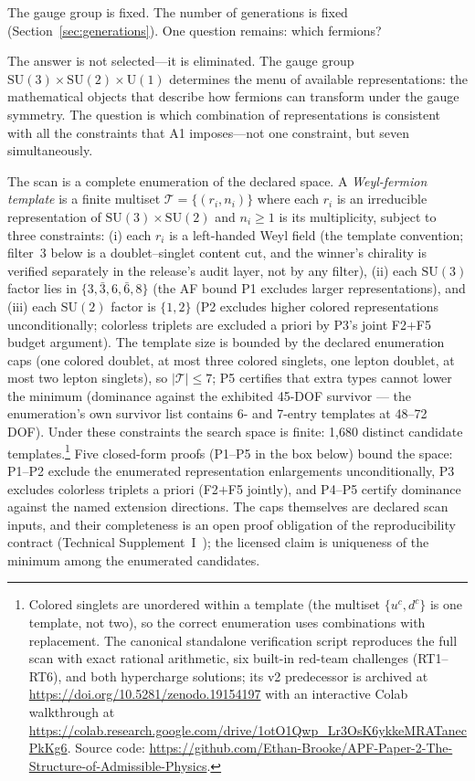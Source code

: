 \documentclass[11pt]{article}
\newcommand{\SU}{\mathrm{SU}}
\newcommand{\U}{\mathrm{U}}
\begin{document}
The gauge group is fixed.  The number of generations is fixed (Section~\ref{sec:generations}).  One question remains: which fermions?

The answer is not selected---it is eliminated.  The gauge group $\SU(3) \times \SU(2) \times \U(1)$ determines the menu of available representations: the mathematical objects that describe how fermions can transform under the gauge symmetry.  The question is which combination of representations is consistent with all the constraints that A1 imposes---not one constraint, but seven simultaneously.

The scan is a complete enumeration of the declared space.  A \emph{Weyl-fermion template} is a finite multiset $\mathcal{T} = \{(r_i, n_i)\}$ where each $r_i$ is an irreducible representation of $\SU(3) \times \SU(2)$ and $n_i \ge 1$ is its multiplicity, subject to three constraints: (i) each $r_i$ is a left-handed Weyl field (the template convention; filter~3 below is a doublet--singlet content cut, and the winner's chirality is verified separately in the release's audit layer, not by any filter), (ii) each $\SU(3)$ factor lies in $\{3, \bar{3}, 6, \bar{6}, 8\}$ (the AF bound P1 excludes larger representations), and (iii) each $\SU(2)$ factor is $\{1, 2\}$ (P2 excludes higher colored representations unconditionally; colorless triplets are excluded a priori by P3's joint F2$+$F5 budget argument).  The template size is bounded by the declared enumeration caps (one colored doublet, at most three colored singlets, one lepton doublet, at most two lepton singlets), so $|\mathcal{T}| \le 7$; P5 certifies that extra types cannot lower the minimum (dominance against the exhibited 45-DOF survivor --- the enumeration's own survivor list contains 6- and 7-entry templates at 48--72 DOF).  Under these constraints the search space is finite: 1{,}680 distinct candidate templates.\footnote{Colored singlets are unordered within a template (the multiset $\{u^c, d^c\}$ is one template, not two), so the correct enumeration uses combinations with replacement.  The canonical standalone verification script reproduces the full scan with exact rational arithmetic, six built-in red-team challenges (RT1--RT6), and both hypercharge solutions; its v2 predecessor is archived at \url{https://doi.org/10.5281/zenodo.19154197} with an interactive Colab walkthrough at \url{https://colab.research.google.com/drive/1otO1Qwp_Lr3OsK6ykkeMRATanecPkKg6}.  Source code: \url{https://github.com/Ethan-Brooke/APF-Paper-2-The-Structure-of-Admissible-Physics}.}  Five closed-form proofs (P1--P5 in the box below) bound the space: P1--P2 exclude the enumerated representation enlargements unconditionally, P3 excludes colorless triplets a priori (F2$+$F5 jointly), and P4--P5 certify dominance against the named extension directions.  The caps themselves are declared scan inputs, and their completeness is an open proof obligation of the reproducibility contract (Technical Supplement~I~\cite{BrookeP2Supplement}); the licensed claim is uniqueness of the minimum among the enumerated candidates.
\end{document}
